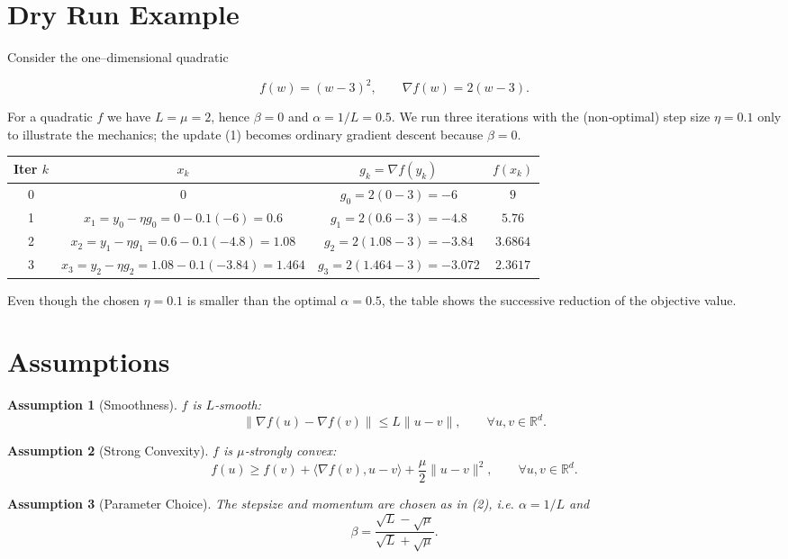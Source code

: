 \documentclass{article}
\newtheorem{assumption}{Assumption}
\begin{document}
\section*{Dry Run Example}
Consider the one–dimensional quadratic  

\[
f(w)=(w-3)^2,\qquad \nabla f(w)=2(w-3).
\]

For a quadratic $f$ we have $L=\mu=2$, hence $\beta=0$ and $\alpha=1/L=0.5$.  
We run three iterations with the (non‑optimal) step size $\eta=0.1$ only to illustrate the mechanics; the update (1) becomes ordinary gradient descent because $\beta=0$.

\begin{center}
\begin{tabular}{c|c|c|c}
Iter $k$ & $x_k$ & $g_k=\nabla f(y_k)$ & $f(x_k)$\\ \hline
0 & $0$ & $g_0=2(0-3)=-6$ & $9$\\
1 & $x_1= y_0-\eta g_0 =0-0.1(-6)=0.6$ & $g_1=2(0.6-3)=-4.8$ & $5.76$\\
2 & $x_2= y_1-\eta g_1 =0.6-0.1(-4.8)=1.08$ & $g_2=2(1.08-3)=-3.84$ & $3.6864$\\
3 & $x_3= y_2-\eta g_2 =1.08-0.1(-3.84)=1.464$ & $g_3=2(1.464-3)=-3.072$ & $2.3617$
\end{tabular}
\end{center}

Even though the chosen $\eta=0.1$ is smaller than the optimal $\alpha=0.5$, the table shows the successive reduction of the objective value.

\section*{Assumptions}
\begin{assumption}[Smoothness]\label{ass:smooth}
$f$ is $L$‑smooth: 
\[
\|\nabla f(u)-\nabla f(v)\|\le L\|u-v\|,\qquad\forall u,v\in\mathbb{R}^{d}.
\]
\end{assumption}
\begin{assumption}[Strong Convexity]\label{ass:strong}
$f$ is $\mu$‑strongly convex:
\[
f(u)\ge f(v)+\langle\nabla f(v),u-v\rangle+\frac{\mu}{2}\|u-v\|^{2},\qquad\forall u,v\in\mathbb{R}^{d}.
\]
\end{assumption}
\begin{assumption}[Parameter Choice]\label{ass:param}
The stepsize and momentum are chosen as in (2), i.e. $\alpha=1/L$ and 
\[
\beta=\frac{\sqrt{L}-\sqrt{\mu}}{\sqrt{L}+\sqrt{\mu}}.
\]
\end{assumption}
\end{document}

